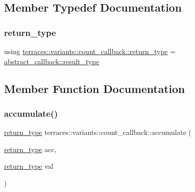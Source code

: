 \subsection{Member Typedef Documentation}
\mbox{\label{classterraces_1_1variants_1_1count__callback_adb8cc586b7f8d5aeaa4d1d83c36c5cb8}} 
\subsubsection{\texorpdfstring{return\+\_\+type}{return\_type}}
{\footnotesize\ttfamily using \hyperlink{classterraces_1_1variants_1_1count__callback_adb8cc586b7f8d5aeaa4d1d83c36c5cb8}{terraces\+::variants\+::count\+\_\+callback\+::return\+\_\+type} =  \hyperlink{classterraces_1_1variants_1_1abstract__callback_ac1da94f0be306068e89627dc40cd0f3b}{abstract\+\_\+callback\+::result\+\_\+type}}



\subsection{Member Function Documentation}
\mbox{\label{classterraces_1_1variants_1_1count__callback_a9760d7bb4a9681b6cb06f6c5c35b3152}} 
\subsubsection{\texorpdfstring{accumulate()}{accumulate()}}
{\footnotesize\ttfamily \hyperlink{classterraces_1_1variants_1_1count__callback_adb8cc586b7f8d5aeaa4d1d83c36c5cb8}{return\+\_\+type} terraces\+::variants\+::count\+\_\+callback\+::accumulate (\begin{DoxyParamCaption}\item[{\hyperlink{classterraces_1_1variants_1_1count__callback_adb8cc586b7f8d5aeaa4d1d83c36c5cb8}{return\+\_\+type}}]{acc,  }\item[{\hyperlink{classterraces_1_1variants_1_1count__callback_adb8cc586b7f8d5aeaa4d1d83c36c5cb8}{return\+\_\+type}}]{val }\end{DoxyParamCaption})\hspace{0.3cm}{\ttfamily [inline]}}

